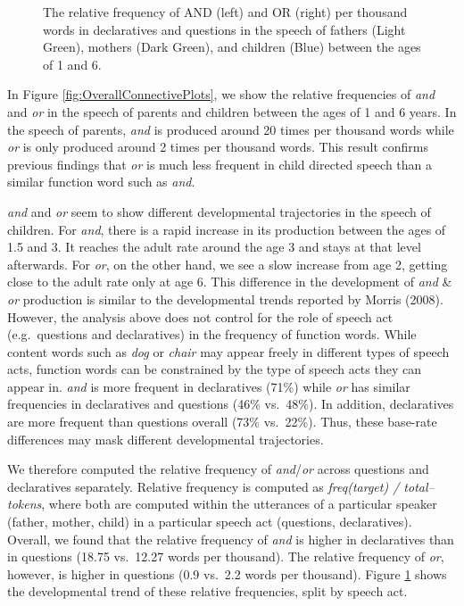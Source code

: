 \documentclass[10pt, letterpaper]{article}
\newenvironment{CodeChunk}{}{}
\begin{document}
\begin{CodeChunk}
\begin{figure}[t]
{}

\caption[The relative frequency of AND (left) and OR (right) per thousand words in declaratives and questions in the speech of fathers (Light Green), mothers (Dark Green), and children (Blue) between the ages of 1 and 6]{The relative frequency of AND (left) and OR (right) per thousand words in declaratives and questions in the speech of fathers (Light Green), mothers (Dark Green), and children (Blue) between the ages of 1 and 6.}\label{fig:byspeechActPlots}
\end{figure}
\end{CodeChunk}

In Figure \ref{fig:OverallConnectivePlots}, we show the relative
frequencies of \emph{and} and \emph{or} in the speech of parents and
children between the ages of 1 and 6 years. In the speech of parents,
\emph{and} is produced around 20 times per thousand words while
\emph{or} is only produced around 2 times per thousand words. This
result confirms previous findings that \emph{or} is much less frequent
in child directed speech than a similar function word such as
\emph{and}.

\emph{and} and \emph{or} seem to show different developmental
trajectories in the speech of children. For \emph{and}, there is a rapid
increase in its production between the ages of 1.5 and 3. It reaches the
adult rate around the age 3 and stays at that level afterwards. For
\emph{or}, on the other hand, we see a slow increase from age 2, getting
close to the adult rate only at age 6. This difference in the
development of \emph{and} \& \emph{or} production is similar to the
developmental trends reported by Morris (2008). However, the analysis
above does not control for the role of speech act (e.g.~questions and
declaratives) in the frequency of function words. While content words
such as \emph{dog} or \emph{chair} may appear freely in different types
of speech acts, function words can be constrained by the type of speech
acts they can appear in. \emph{and} is more frequent in declaratives
(71\%) while \emph{or} has similar frequencies in declaratives and
questions (46\% vs.~48\%). In addition, declaratives are more frequent
than questions overall (73\% vs.~22\%). Thus, these base-rate
differences may mask different developmental trajectories.

We therefore computed the relative frequency of \emph{and}/\emph{or}
across questions and declaratives separately. Relative frequency is
computed as \emph{freq(target) / total--tokens}, where both are computed
within the utterances of a particular speaker (father, mother, child) in
a particular speech act (questions, declaratives). Overall, we found
that the relative frequency of \emph{and} is higher in declaratives than
in questions (18.75 vs.~12.27 words per thousand). The relative
frequency of \emph{or}, however, is higher in questions (0.9 vs.~2.2
words per thousand). Figure \ref{fig:byspeechActPlots} shows the
developmental trend of these relative frequencies, split by speech act.
\end{document}
